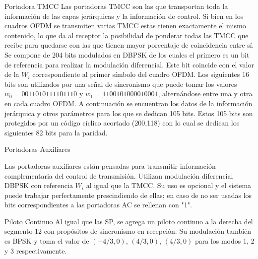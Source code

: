 
Portadora TMCC
Las portadoras TMCC son las que transportan toda la información de las capas jerárquicas y la información de control. Si bien en los cuadros OFDM se transmiten varias TMCC estas tienen exactamente el mismo contenido, lo que da al receptor la posibilidad de ponderar todas las TMCC que recibe para quedarse con las que tienen mayor porcentaje de coincidencia entre sí.
Se compone de 204 bits modulados en DBPSK de los cuales el primero es un bit de referencia para realizar la modulación diferencial. Este bit coincide con el valor de la $W_i$ correspondiente al primer símbolo del cuadro OFDM.
Los siguientes 16 bits son utilizados por una señal de sincronismo que puede tomar los valores $w_0 = 0011010111101110$ y $w_1 = 1100101000010001$, alternándose entre una y otra en cada cuadro OFDM.
A continuación se encuentran los datos de la información jerárquica y otros parámetros para los que se dedican 105 bits. Estos 105 bits son protegidos por un código cíclico acortado (200,118) con lo cual se dedican los siguientes 82 bits para la paridad. 
  
Portadoras Auxiliares

Las portadoras auxiliares están pensadas para transmitir información complementaria del control de transmisión. Utilizan modulación diferencial DBPSK con referencia $W_i$ al igual que la TMCC. Su uso es opcional y el sistema puede trabajar perfectamente prescindiendo de ellas; en caso de no ser usadas los bits correspondientes a las portadoras AC se rellenan con "1".

Piloto Continuo
Al igual que las SP, se agrega un piloto continuo a la derecha del segmento 12 con propósitos de sincronismo en recepción. Su modulación también es BPSK y toma el valor de $(-4/3, 0)$, $(4/3, 0)$, $(4/3, 0)$ para los modos 1, 2 y 3 respectivamente.








